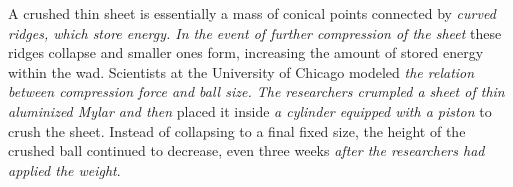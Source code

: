 \documentclass[output=paper]{LSP/langsci}
\begin{document}
A crushed thin sheet is essentially a mass of conical points connected by \textit{curved ridges, which store energy. In the event of further compression of the sheet} these ridges collapse and smaller ones form, increasing the amount of stored energy within the wad. Scientists at the University of Chicago modeled \textit{the relation between compression force and ball size. The researchers crumpled a sheet of thin aluminized Mylar and then} placed it inside \textit{a cylinder equipped with a piston} to crush the sheet. Instead of collapsing to a final fixed size, the height of the crushed ball continued to decrease, even three weeks \textit{after the researchers had applied the weight}.


\printbibliography[heading=subbibliography,notkeyword=this]
\end{document}
